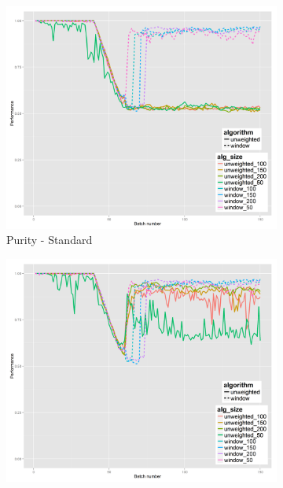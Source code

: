 \begin{figure}[H]
        \centering
        \begin{subfigure}[b]{0.47\textwidth}
          \includegraphics[width=\textwidth]{standard_alt/ci_evolving_pen_48_49_standard_purity.png}         
                 \caption{Purity - Standard}
                 \label{fig:ps_4849}
        \end{subfigure}
        \begin{subfigure}[b]{0.47\textwidth}
                 \includegraphics[width=\textwidth]{standard_alt/ci_evolving_pen_48_49_alternative_purity.png}

\end{subfigure}
\end{figure}
